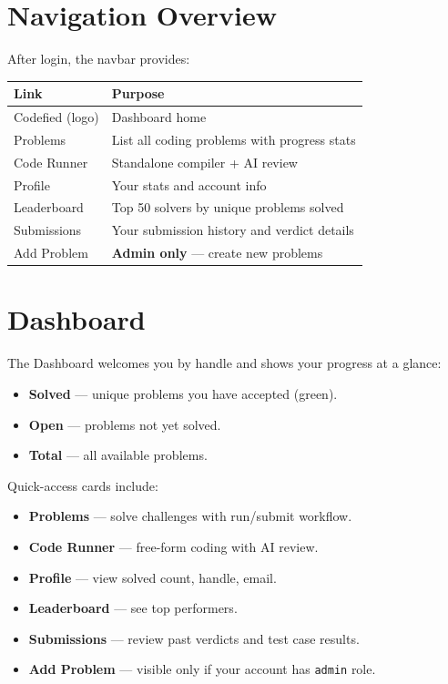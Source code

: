 \documentclass[11pt,a4paper]{article}
\begin{document}
\section{Navigation Overview}

After login, the navbar provides:

\begin{table}[h]
\centering
\begin{tabular}{@{}ll@{}}
\toprule
\textbf{Link} & \textbf{Purpose} \\
\midrule
Codefied (logo) & Dashboard home \\
Problems        & List all coding problems with progress stats \\
Code Runner     & Standalone compiler + AI review \\
Profile         & Your stats and account info \\
Leaderboard     & Top 50 solvers by unique problems solved \\
Submissions     & Your submission history and verdict details \\
Add Problem     & \textbf{Admin only} --- create new problems \\
\bottomrule
\end{tabular}
\end{table}

\section{Dashboard}

The Dashboard welcomes you by handle and shows your progress at a glance:

\begin{itemize}[noitemsep]
  \item \textbf{Solved} --- unique problems you have accepted (green).
  \item \textbf{Open} --- problems not yet solved.
  \item \textbf{Total} --- all available problems.
\end{itemize}

Quick-access cards include:
\begin{itemize}[noitemsep]
  \item \textbf{Problems} --- solve challenges with run/submit workflow.
  \item \textbf{Code Runner} --- free-form coding with AI review.
  \item \textbf{Profile} --- view solved count, handle, email.
  \item \textbf{Leaderboard} --- see top performers.
  \item \textbf{Submissions} --- review past verdicts and test case results.
  \item \textbf{Add Problem} --- visible only if your account has \texttt{admin} role.
\end{itemize}
\end{document}

